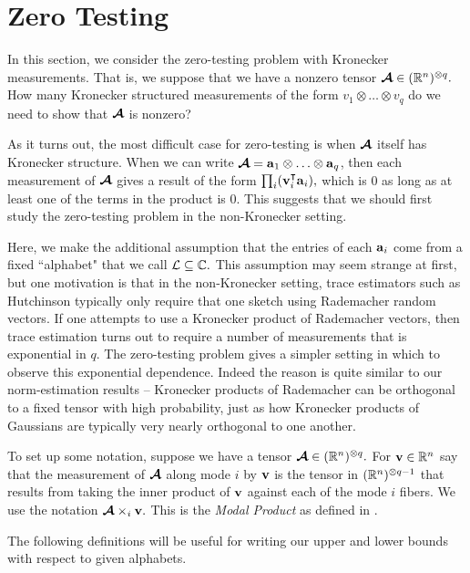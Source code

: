 
\section{Zero Testing}
\label{sec:zero-testing}

In this section, we consider the zero-testing problem with Kronecker measurements.  That is, we suppose that we have a nonzero tensor $\boldsymbol{\mathcal{A}} \in (\mathbb{R}^{n})^{\otimes q}.$ How many Kronecker structured measurements of the form $v_1 \otimes \ldots \otimes v_q$ do we need to show that $\boldsymbol{\mathcal{A}}$ is nonzero?

As it turns out, the most difficult case for zero-testing is when $\boldsymbol{\mathcal{A}}$ itself has Kronecker structure.  When we can write $\boldsymbol{\mathcal{A}} = \boldsymbol{\mathrm{a}}_1 \otimes \ldots \otimes \boldsymbol{\mathrm{a}}_q$, then each measurement of $\boldsymbol{\mathcal{A}}$ gives a result of the form $\prod_i (\boldsymbol{\mathrm{v}}_i^\intercal \boldsymbol{\mathrm{a}}_i),$ which is $0$ as long as at least one of the terms in the product is $0.$   This suggests that we should first study the zero-testing problem in the non-Kronecker setting.

Here, we make the additional assumption that the entries of each $\boldsymbol{\mathrm{a}}_i$ come from a fixed ``alphabet" that we call ${\mathcal L} \subseteq \mathbb{C}.$  This assumption may seem strange at first, but one motivation is that in the non-Kronecker setting, trace estimators such as Hutchinson typically only require that one sketch using Rademacher random vectors.  If one attempts to use a Kronecker product of Rademacher vectors, then trace estimation turns out to require a number of measurements that is exponential in $q.$  The zero-testing problem gives a simpler setting in which to observe this exponential dependence.  Indeed the reason is quite similar to our norm-estimation results -- Kronecker products of Rademacher can be orthogonal to a fixed tensor with high probability, just as how Kronecker products of Gaussians are typically very nearly orthogonal to one another.


To set up some notation, suppose we have a tensor $\boldsymbol{\mathcal{A}} \in (\mathbb{R}^{n})^{\otimes q}.$  For $\boldsymbol{\mathrm{v}} \in \mathbb{R}^{n}$ say that the measurement of $\boldsymbol{\mathcal{A}}$ along mode $i$ by $\boldsymbol{\mathrm{v}}$ is the tensor in $(\mathbb{R}^{n})^{\otimes q-1}$ that results from taking the inner product of $\boldsymbol{\mathrm{v}}$ against each of the mode $i$ fibers.
We use the notation $\boldsymbol{\mathcal{A}} \times_i \boldsymbol{\mathrm{v}}.$
This is the \emph{Modal Product} as defined in \cite{golub2013matrix}.

The following definitions will be useful for writing our upper and lower bounds with respect to given alphabets.

